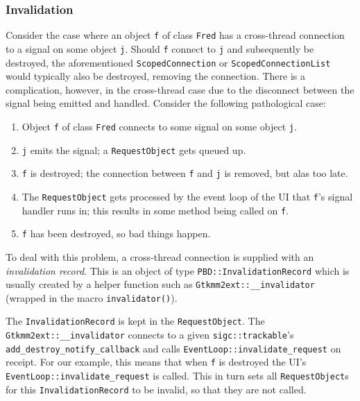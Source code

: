 \documentclass[10pt,a4paper]{book}
\newcommand{\code}[1]{\texttt{#1}}
\begin{document}
\subsubsection{Invalidation}

Consider the case where an object \code{f} of class \code{Fred} has a
cross-thread connection to a signal on some object \code{j}.  Should
\code{f} connect to \code{j} and subsequently be destroyed, the
aforementioned \code{ScopedConnection} or \code{ScopedConnectionList}
would typically also be destroyed, removing the connection.  There is
a complication, however, in the cross-thread case due to the
disconnect between the signal being emitted and handled.  Consider the
following pathological case:

\begin{enumerate}
\item Object \code{f} of class \code{Fred} connects to some signal on some object \code{j}.
\item \code{j} emits the signal; a \code{RequestObject} gets queued up.
\item \code{f} is destroyed; the connection between \code{f} and
  \code{j} is removed, but alas too late.
\item The \code{RequestObject} gets processed by the event loop of the
  UI that \code{f}'s signal handler runs in; this results in some
  method being called on \code{f}.
\item \code{f} has been destroyed, so bad things happen.
\end{enumerate}

To deal with this problem, a cross-thread connection is supplied with
an \emph{invalidation record}.  This is an object of type
\code{PBD::InvalidationRecord} which is usually created by a helper
function such as \code{Gtkmm2ext::\_\_invalidator} (wrapped in the macro
\code{invalidator()}).

The \code{InvalidationRecord} is kept in the \code{RequestObject}.
The \code{Gtkmm2ext::\_\_invalidator} connects to a given
\code{sigc::trackable}'s \code{add\_destroy\_notify\_callback} and
calls \code{EventLoop::invalidate\_request} on receipt.  For our
example, this means that when \code{f} is destroyed the UI's
\code{EventLoop::invalidate\_request} is called.  This in turn sets
all \code{RequestObject}s for this \code{InvalidationRecord} to be
invalid, so that they are not called.
\end{document}
